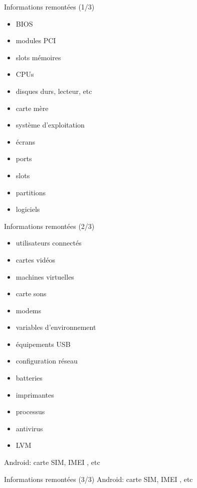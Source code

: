 \documentclass{beamer}
\begin{document}
\begin{frame}
    \begin{block}{Informations remontées (1/3)}
        \begin{itemize}
        \item BIOS
        \item modules PCI
        \item slots mémoires
        \item CPUs
        \item disques durs, lecteur, etc
        \item carte mère
        \item système d'exploitation
        \item écrans
        \item ports
        \item slots
        \item partitions
        \item logiciels
        \end{itemize}
    \end{block}
\end{frame}

\begin{frame}
    \begin{block}{Informations remontées (2/3)}
        \begin{itemize}
        \item utilisateurs connectés
        \item cartes vidéos
        \item machines virtuelles
        \item carte sons
        \item modems
        \item variables d'environnement
        \item équipements USB
        \item configuration réseau
        \item batteries
        \item imprimantes
        \item processus
        \item antivirus
        \item LVM
        \end{itemize}
        Android: carte SIM, IMEI , etc
    \end{block}
\end{frame}

\begin{frame}
    \begin{block}{Informations remontées (3/3)}
        Android: carte SIM, IMEI , etc
    \end{block}
\end{frame}
\end{document}

